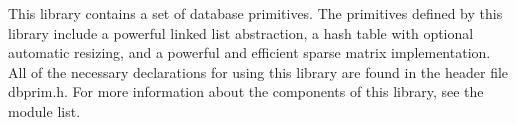  This library contains a set of database primitives. The primitives defined by this library include a powerful linked list abstraction, a hash table with optional automatic resizing, and a powerful and efficient sparse matrix implementation. All of the necessary declarations for using this library are found in the header file dbprim.h. For more information about the components of this library, see the module list.

